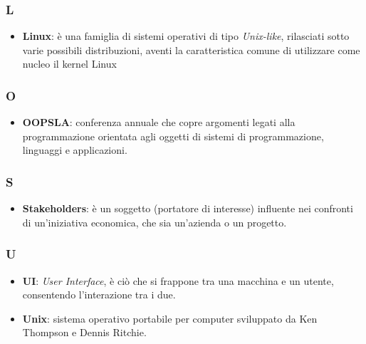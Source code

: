 \subsubsection{L}
\begin{itemize}
	\item \textbf{Linux}: è una famiglia di sistemi operativi di tipo \textit{Unix-like}, rilasciati sotto varie possibili distribuzioni, aventi la caratteristica comune di utilizzare come nucleo il kernel Linux
\end{itemize}

\subsubsection{O}
\begin{itemize}
	\item \textbf{OOPSLA}: conferenza annuale che copre argomenti legati alla programmazione orientata agli oggetti di sistemi di programmazione, linguaggi e applicazioni.
\end{itemize}

\subsubsection{S}
\begin{itemize}
	\item \textbf{Stakeholders}: è un soggetto (portatore di interesse) influente nei confronti di un'iniziativa economica, che sia un'azienda o un progetto.
\end{itemize}

\subsubsection{U}
\begin{itemize}
	\item \textbf{UI}: \textit{User Interface}, è ciò che si frappone tra una macchina e un utente, consentendo l'interazione tra i due.
	\item \textbf{Unix}: sistema operativo portabile per computer sviluppato da Ken Thompson e Dennis Ritchie.
\end{itemize}

